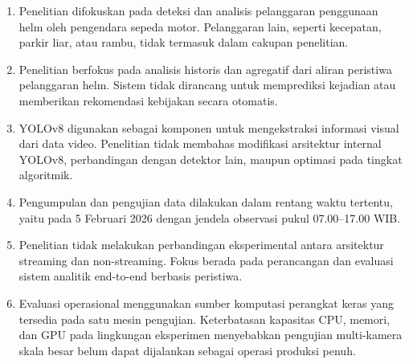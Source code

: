 \begin{enumerate}
  \item Penelitian difokuskan pada deteksi dan analisis pelanggaran penggunaan helm oleh pengendara sepeda motor. Pelanggaran lain, seperti kecepatan, parkir liar, atau rambu, tidak termasuk dalam cakupan penelitian.

  \item Penelitian berfokus pada analisis historis dan agregatif dari aliran peristiwa pelanggaran helm. Sistem tidak dirancang untuk memprediksi kejadian atau memberikan rekomendasi kebijakan secara otomatis.

  \item YOLOv8 digunakan sebagai komponen untuk mengekstraksi informasi visual dari data video. Penelitian tidak membahas modifikasi arsitektur internal YOLOv8, perbandingan dengan detektor lain, maupun optimasi pada tingkat algoritmik.

  \item Pengumpulan dan pengujian data dilakukan dalam rentang waktu tertentu, yaitu pada 5 Februari 2026 dengan jendela observasi pukul 07.00--17.00 WIB.

  \item Penelitian tidak melakukan perbandingan eksperimental antara arsitektur streaming dan non-streaming. Fokus berada pada perancangan dan evaluasi sistem analitik end-to-end berbasis peristiwa.

  \item Evaluasi operasional menggunakan sumber komputasi perangkat keras yang tersedia pada satu mesin pengujian. Keterbatasan kapasitas CPU, memori, dan GPU pada lingkungan eksperimen menyebabkan pengujian multi-kamera skala besar belum dapat dijalankan sebagai operasi produksi penuh.
\end{enumerate}

